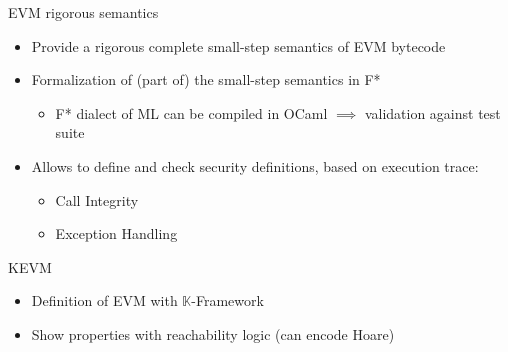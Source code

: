 \begin{frame}{EVM rigorous semantics~}

\begin{block}{\cite{grishchenko2018semantic}}
\begin{itemize}
	\item Provide a rigorous complete small-step semantics of EVM bytecode
	\item Formalization of (part of) the small-step semantics in F*
	\begin{itemize}
		\item F* dialect of ML can be compiled in OCaml $\implies$ validation against test suite
	\end{itemize}
	\item Allows to define and check security definitions, based on execution trace:
	\begin{itemize}
		\item Call Integrity
		\item Exception Handling
	\end{itemize}
\end{itemize}
\end{block}

\begin{block}{KEVM~\cite{bib:kevm}}
\begin{itemize}
\item Definition of EVM with $\mathbb{K}$-Framework
\item Show properties with reachability logic (can encode Hoare)

\end{itemize}
\end{block}

\end{frame}